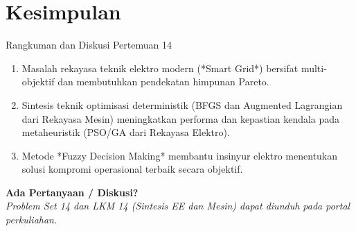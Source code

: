 \documentclass[10pt,aspectratio=169]{beamer}
\begin{document}
\section{Kesimpulan}

\begin{frame}{Rangkuman dan Diskusi Pertemuan 14}
    \begin{tcolorbox}[colback=unibblue!10,colframe=unibblue,title=\textbf{Poin Kunci Sintesis Pembelajaran}]
        \begin{enumerate}
            \item Masalah rekayasa teknik elektro modern (*Smart Grid*) bersifat multi-objektif dan membutuhkan pendekatan himpunan Pareto.
            \item Sintesis teknik optimisasi deterministik (BFGS dan Augmented Lagrangian dari Rekayasa Mesin) meningkatkan performa dan kepastian kendala pada metaheuristik (PSO/GA dari Rekayasa Elektro).
            \item Metode *Fuzzy Decision Making* membantu insinyur elektro menentukan solusi kompromi operasional terbaik secara objektif.
        \end{enumerate}
    \end{tcolorbox}

    \vspace{0.4cm}
    \begin{center}
        \Large \textbf{Ada Pertanyaan / Diskusi?} \\
        \vspace{0.2cm}
        \small \textit{Problem Set 14 dan LKM 14 (Sintesis EE dan Mesin) dapat diunduh pada portal perkuliahan.}
    \end{center}
\end{frame}
\end{document}

